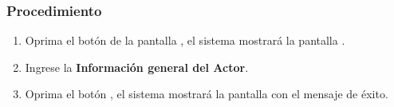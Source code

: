 \subsubsection{Procedimiento}
\begin{enumerate}
	\item Oprima el botón  de la pantalla , el sistema mostrará la pantalla . 

	
	\item Ingrese la \textbf{Información general del Actor}.
	
	\item Oprima el botón , el sistema mostrará la pantalla  con el mensaje de éxito.
\end{enumerate}


